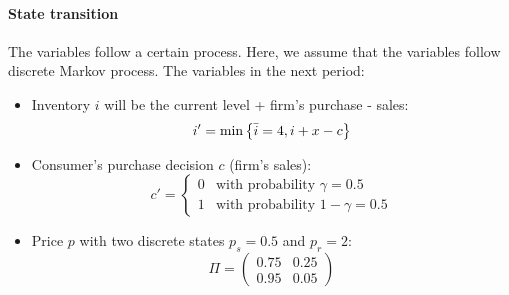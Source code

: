 \documentclass[12pt]{article}[margin=1in]
\begin{document}
\paragraph{State transition} The variables follow a certain process. Here, we assume that the variables
follow discrete Markov process. The variables in the next period:
\begin{itemize}
    \item Inventory $i$ will be the current level + firm's purchase - sales: \begin{equation*}
              i'=\min \left\{\bar{i}=4,i+x-c\right\}
          \end{equation*}
    \item Consumer's purchase decision $c$ (firm's sales):\begin{equation*}
              c'=\begin{cases}
                  0 & \text{with probability } \gamma = 0.5   \\
                  1 & \text{with probability } 1-\gamma = 0.5
              \end{cases}
          \end{equation*}
    \item Price $p$ with two discrete states $p_s=0.5$ and $p_r=2$: \begin{equation*}
              \Pi=\begin{pmatrix}
                  0.75 & 0.25 \\
                  0.95 & 0.05
              \end{pmatrix}
          \end{equation*}
\end{itemize}
\end{document}

